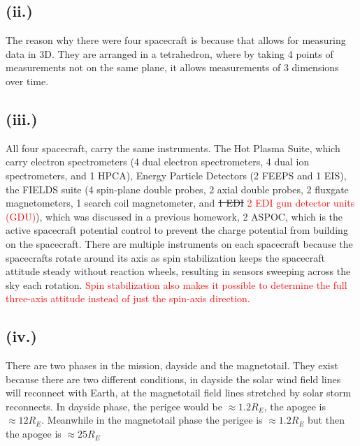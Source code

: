 \documentclass[11pt]{article}
\begin{document}
\subsection*{(ii.)}
\hspace*{2em}The reason why there were four spacecraft is because that allows for measuring data in 3D. They are arranged in a tetrahedron, where by taking 4 points of measurements not on the same plane, it allows measurements of 3 dimensions over time. 
\subsection*{(iii.)}
\hspace*{2em}All four spacecraft, carry the same instruments. The Hot Plasma Suite, which carry electron spectrometers (4 dual electron spectrometers, 4 dual ion spectrometers, and 1 HPCA), Energy Particle Detectors (2 FEEPS and 1 EIS), the FIELDS suite (4 spin-plane double probes, 2 axial double probes, 2 fluxgate magnetometers, 1 search coil magnetometer, and \sout{1 EDI} \textcolor{red}{2 EDI gun detector units (GDU)}), which was discussed in a previous homework, 2 ASPOC, which is the active spacecraft potential control to prevent the charge potential from building on the spacecraft. There are multiple instruments on each spacecraft because the spacecrafts rotate around its axis as spin stabilization keeps the spacecraft attitude steady without reaction wheels, resulting in sensors sweeping across the sky each rotation. \textcolor{red}{Spin stabilization also makes it possible to determine the full three-axis attitude instead of just the spin-axis direction.}

\subsection*{(iv.)}
\hspace*{2em}There are two phases in the mission, dayside and the magnetotail. They exist because there are two different conditions, in dayside the solar wind field lines will reconnect with Earth, at the magnetotail field lines stretched by solar storm reconnects. In dayside phase, the perigee would be $\approx 1.2 R_E$, the apogee is $\approx 12 R_E$. Meanwhile in the magnetotail phase the perigee is $\approx1.2 R_E$ but then the apogee is $\approx25 R_E$
\end{document}
